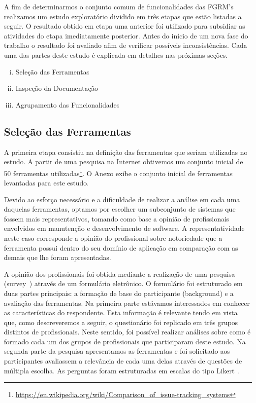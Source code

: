 A fim de determinarmos o conjunto comum de funcionalidades das FGRM's realizamos
um estudo exploratório dividido em três etapas que estão listadas a seguir. O
resultado obtido em etapa uma anterior foi utilizado para subsidiar as
atividades do etapa imediatamente posterior. Antes do início de um nova fase do
trabalho o resultado foi avaliado afim de verificar possíveis inconsistências.
Cada uma das partes deste estudo é explicada em detalhes nas próximas seções.

\begin{enumerate}[(i)]
	\item Seleção das Ferramentas
	\item Inspeção da Documentação
	\item Agrupamento das Funcionalidades
\end{enumerate}

\subsection{Seleção das Ferramentas}
\label{subsec:selecao-ferramentas}

A primeira etapa consistiu na definição das ferramentas que seriam utilizadas no
estudo. A partir de uma pesquisa na Internet obtivemos um conjunto inicial de 50
ferramentas
utilizadas\footnote{\url{https://en.wikipedia.org/wiki/Comparison_of_issue-tracking_systems}}.
O Anexo exibe o conjunto inicial de ferramentas levantadas para este estudo.

Devido ao esforço necessário e a dificuldade de realizar a análise em cada uma
daquelas ferramentas, optamos por escolher um subconjunto de sistemas que fossem
mais representativos, tomando como base a opinião de profissionais envolvidos em
manutenção e desenvolvimento de software. A representatividade neste caso
corresponde a opinião do profissional sobre notoriedade que a ferramenta possui
dentro do seu domínio de aplicação em comparação com as demais que lhe foram
apresentadas.

A opinião dos profissionais foi obtida mediante a realização de uma pesquisa
(survey~\cite{wohlin2012experimentation}) através de um formulário eletrônico.
O formulário foi estruturado em duas partes principais: a formação de base do
participante (background) e a avaliação das ferramentas. Na primeira parte
estávamos interessados em conhecer as características do respondente. Esta
informação é relevante tendo em vista que, como descreveremos a seguir, o
questionário foi replicado em três grupos distintos de profissionais. Neste
sentido, foi possível realizar análises sobre como é formado cada um dos grupos
de profissionais que participaram deste estudo. Na segunda parte da pesquisa
apresentamos as ferramentas e foi solicitado aos participantes avaliassem a
relevância de cada uma delas através de questões de múltipla escolha. As
perguntas foram estruturadas em escalas do tipo
Likert~\cite{robbins2011plotting}.

